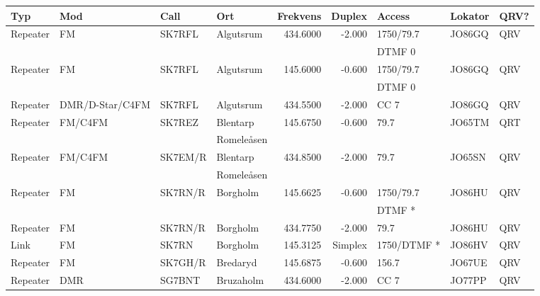 \begin{landscape}
\begin{longtable}{llllrrlll}
\bf Typ  & \bf Mod         & \bf Call & \bf Ort      & \bf Frekvens & \bf Duplex & \bf Access   & \bf Lokator & \bf QRV? \\ \hline \endhead
Repeater & FM              & SK7RFL   & Algutsrum    & 434.6000     & -2.000     & 1750/79.7    & JO86GQ      & QRV      \\
         &                 &          &              &              &            & DTMF 0       &             &          \\
Repeater & FM              & SK7RFL   & Algutsrum    & 145.6000     & -0.600     & 1750/79.7    & JO86GQ      & QRV      \\
         &                 &          &              &              &            & DTMF 0       &             &          \\
Repeater & DMR/D-Star/C4FM & SK7RFL   & Algutsrum    & 434.5500     & -2.000     & CC 7         & JO86GQ      & QRV      \\
Repeater & FM/C4FM         & SK7REZ   & Blentarp     & 145.6750     & -0.600     & 79.7         & JO65TM      & QRT      \\
         &                 &          & Romeleåsen   &              &            &              &             &          \\
Repeater & FM/C4FM         & SK7EM/R  & Blentarp     & 434.8500     & -2.000     & 79.7         & JO65SN      & QRV      \\
         &                 &          & Romeleåsen   &              &            &              &             &          \\
Repeater & FM              & SK7RN/R  & Borgholm     & 145.6625     & -0.600     & 1750/79.7    & JO86HU      & QRV      \\
         &                 &          &              &              &            & DTMF *       &             &          \\
Repeater & FM              & SK7RN/R  & Borgholm     & 434.7750     & -2.000     & 79.7         & JO86HU      & QRV      \\
Link     & FM              & SK7RN    & Borgholm     & 145.3125     & Simplex    & 1750/DTMF *  & JO86HV      & QRV      \\
Repeater & FM              & SK7GH/R  & Bredaryd     & 145.6875     & -0.600     & 156.7        & JO67UE      & QRV      \\
Repeater & DMR             & SG7BNT   & Bruzaholm    & 434.6000     & -2.000     & CC 7         & JO77PP      & QRV      \\

\end{longtable}
\end{landscape}
